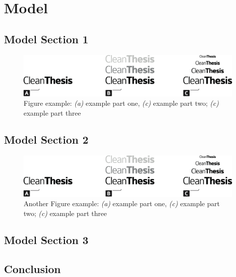 %
\chapter{Model}
\label{sec:model}


\Blindtext[2][1]

\section{Model Section 1}
\label{sec:model:sec1}

\Blindtext[1][2]

\begin{figure}[htb]
	\includegraphics[width=\textwidth]{gfx/Clean-Thesis-Figure}
	\caption{Figure example: \textit{(a)} example part one, \textit{(c)} example part two; \textit{(c)} example part three}
	\label{fig:model:example1}
\end{figure}

\Blindtext[1][2]

\section{Model Section 2}
\label{sec:model:sec2}

\Blindtext[1][2]

\begin{figure}[htb]
	\includegraphics[width=\textwidth]{gfx/Clean-Thesis-Figure}
	\caption{Another Figure example: \textit{(a)} example part one, \textit{(c)} example part two; \textit{(c)} example part three}
	\label{fig:model:example2}
\end{figure}

\Blindtext[2][2]

\section{Model Section 3}
\label{sec:model:sec3}

\Blindtext[4][2]

\section{Conclusion}
\label{sec:model:conclusion}

\Blindtext[2][1]
